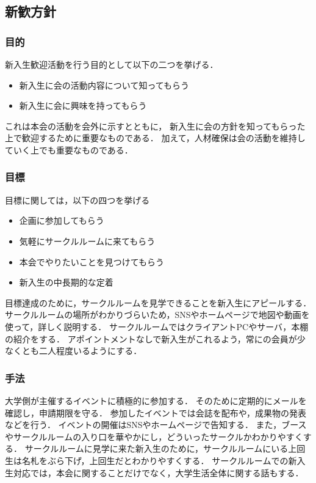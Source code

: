 \subsection*{新歓方針}


\subsubsection*{目的}
新入生歓迎活動を行う目的として以下の二つを挙げる．
\begin{itemize}
\item 新入生に会の活動内容について知ってもらう
\item 新入生に会に興味を持ってもらう
\end{itemize}
これは本会の活動を会外に示すとともに，
新入生に会の方針を知ってもらった上で歓迎するために重要なものである．
加えて，人材確保は会の活動を維持していく上でも重要なものである．

\subsubsection*{目標}
目標に関しては，以下の四つを挙げる
\begin{itemize}
\item 企画に参加してもらう
\item 気軽にサークルルームに来てもらう
\item 本会でやりたいことを見つけてもらう
\item 新入生の中長期的な定着
\end{itemize}
目標達成のために，サークルルームを見学できることを新入生にアピールする．
サークルルームの場所がわかりづらいため，SNSやホームページで地図や動画を使って，詳しく説明する．
サークルルームではクライアントPCやサーバ，本棚の紹介をする．
アポイントメントなしで新入生がこれるよう，常に\secondGrade{}の会員が少なくとも二人程度いるようにする．

\subsubsection*{手法}
大学側が主催するイベントに積極的に参加する．
そのために定期的にメールを確認し，申請期限を守る．
参加したイベントでは会誌を配布や，成果物の発表などを行う．
イベントの開催はSNSやホームページで告知する．
また，ブースやサークルルームの入り口を華やかにし，どういったサークルかわかりやすくする．
サークルルームに見学に来た新入生のために，サークルルームにいる上回生は名札をぶら下げ，上回生だとわかりやすくする．
サークルルームでの新入生対応では，本会に関することだけでなく，大学生活全体に関する話もする．
